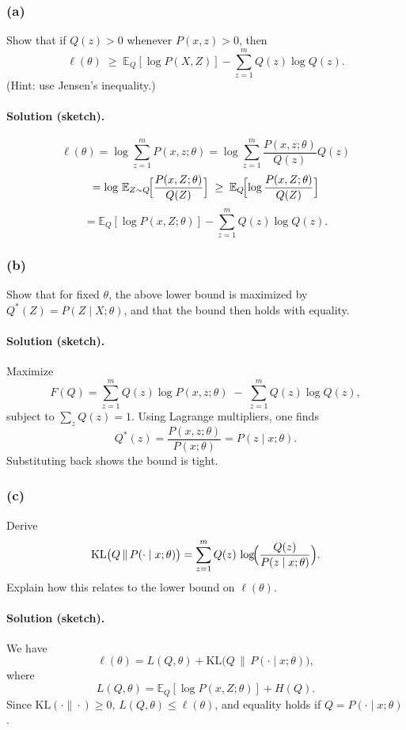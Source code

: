 \documentclass[twocolumn]{article}
\begin{document}
\begin{spacing}{1}
\subsubsection{(a)}
Show that if $Q(z) > 0$ whenever $P(x,z) > 0$, then
\[
\ell(\theta)
\;\ge\;
\mathbb{E}_Q[\log P(X,Z)] - \sum_{z=1}^m Q(z)\log Q(z).
\]
(Hint: use Jensen's inequality.)

\paragraph{Solution (sketch).}
\[
\ell(\theta)
= \log \sum_{z=1}^m P(x,z;\theta)
= \log \sum_{z=1}^m \frac{P(x,z;\theta)}{Q(z)} Q(z)
\]
\[
= \log \,\mathbb{E}_{Z\sim Q}\!\Bigl[\frac{P(x,Z;\theta)}{Q(Z)}\Bigr]
\;\ge\;
\mathbb{E}_Q\!\Bigl[\log \frac{P(x,Z;\theta)}{Q(Z)}\Bigr]
\]
\[
=
\mathbb{E}_Q[\log P(x,Z;\theta)]
- \sum_{z=1}^m Q(z)\log Q(z).
\]

\subsubsection{(b)}
Show that for fixed $\theta$, the above lower bound is maximized by $Q^*(Z) = P(Z \mid X;\theta)$, and that the bound then holds with equality.

\paragraph{Solution (sketch).}
Maximize
\[
F(Q)
= \sum_{z=1}^m Q(z)\log P(x,z;\theta)
\;-\;
\sum_{z=1}^m Q(z)\log Q(z),
\]
subject to $\sum_z Q(z)=1$. Using Lagrange multipliers, one finds
\[
Q^*(z) = \frac{P(x,z;\theta)}{P(x;\theta)}
= P(z \mid x;\theta).
\]
Substituting back shows the bound is tight.

\subsubsection{(c)}
Derive
\[
\mathrm{KL}\bigl(Q\,\|\,P(\cdot\mid x;\theta)\bigr)
= \sum_{z=1}^m Q(z)\,\log\!\Bigl(\frac{Q(z)}{P(z\mid x;\theta)}\Bigr).
\]
Explain how this relates to the lower bound on $\ell(\theta)$.

\paragraph{Solution (sketch).}
We have
\[
\ell(\theta) = L(Q,\theta) + \mathrm{KL}\bigl(Q\,\|\,P(\cdot\mid x;\theta)\bigr),
\]
where
\[
L(Q,\theta)
= \mathbb{E}_Q[\log P(x,Z;\theta)] + H(Q).
\]
Since $\mathrm{KL}(\cdot\|\cdot)\ge0$, $L(Q,\theta)\le \ell(\theta)$, and equality holds if $Q=P(\cdot\mid x;\theta)$.


\end{spacing}
\end{document}
